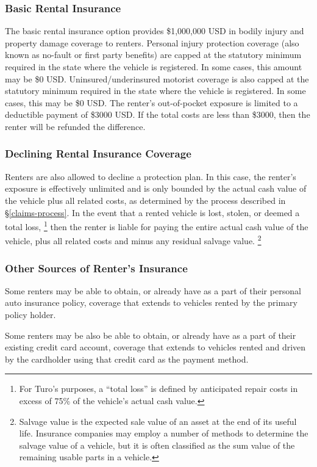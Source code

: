 \documentclass[review,12pt]{elsarticle}
\begin{document}
\subsubsection{Basic Rental Insurance}\label{basic-rental-insurance}
The basic rental insurance option provides \$1,000,000 USD in bodily injury and property damage coverage to renters. Personal injury protection coverage (also known as no-fault or first party benefits) are capped at the statutory minimum required in the state where the vehicle is registered. In some cases, this amount may be \$0 USD. Uninsured/underinsured motorist coverage is also capped at the statutory minimum required in the state where the vehicle is registered. In some cases, this may be \$0 USD. The renter's out-of-pocket exposure is limited to a deductible payment of \$3000 USD. If the total costs are less than \$3000, then the renter will be refunded the difference.

\subsubsection{Declining Rental Insurance Coverage}\label{commercial-insurance}
Renters are also allowed to decline a protection plan. In this case, the renter's exposure is effectively unlimited and is only bounded by the actual cash value of the vehicle plus all related costs, as determined by the process described in \S\ref{claims-process}. In the event that a rented vehicle is lost, stolen, or deemed a total loss,
\footnote{For Turo's purposes, a ``total loss'' is defined by anticipated repair costs in excess of 75\% of the vehicle's actual cash value.
}
then the renter is liable for paying the entire actual cash value of the vehicle, plus all related costs and minus any residual salvage value.
\footnote{Salvage value is the expected sale value of an asset at the end of its useful life. Insurance companies may employ a number of methods to determine the salvage value of a vehicle, but it is often classified as the sum value of the remaining usable parts in a vehicle.
}

\subsubsection{Other Sources of Renter's Insurance}
Some renters may be able to obtain, or already have as a part of their personal auto insurance policy, coverage that extends to vehicles rented by the primary policy holder.

Some renters may be also be able to obtain, or already have as a part of their existing credit card account, coverage that extends to vehicles rented and driven by the cardholder using that credit card as the payment method.
\end{document}
